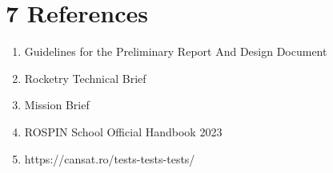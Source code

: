 \section*{7 References}

\begin{enumerate}
    \item Guidelines for the Preliminary Report And Design Document
    \item Rocketry Technical Brief
    \item Mission Brief
    \item ROSPIN School Official Handbook 2023
    \item https://cansat.ro/tests-tests-tests/
\end{enumerate}